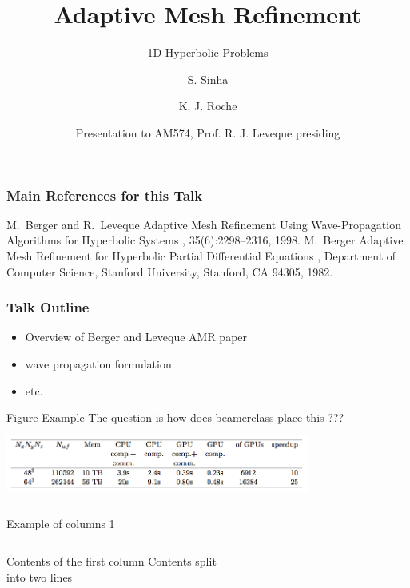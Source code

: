 \documentclass{beamer}
\title[Crisis] %
{Adaptive Mesh Refinement}
\subtitle{1D Hyperbolic Problems}
\author[Author, A] %
{S. Sinha\inst{1} \and K. J. Roche\inst{1,2}}
\institute[Universities Here and There] %
{
  \inst{1}%
  Department of Applied Mathematics\\
  University of Washington
  \and
  \inst{2}%
  High Performance Computing\\
  Pacific Northwest National Laboratory
}
\date[KPT 2004] %
{Presentation to AM574, Prof. R. J. Leveque presiding}
\begin{document}
\frame{\titlepage}
  
  \begin{frame}[allowframebreaks]
  \frametitle<presentation>{Main References for this Talk}    
  \begin{thebibliography}{10}    
  \beamertemplatearticlebibitems
    M.~Berger and R.~Leveque 
    \newblock Adaptive Mesh Refinement Using Wave-Propagation Algorithms for Hyperbolic Systems
    , 35(6):2298--2316, 1998.
      \beamertemplatearticlebibitems
    M.~Berger
    \newblock Adaptive Mesh Refinement for Hyperbolic Partial Differential Equations
    , Department of Computer Science, Stanford University, Stanford, CA 94305, 1982.
  \end{thebibliography}
\end{frame}

  \begin{frame}
    \frametitle{Talk Outline}
    \begin{itemize}
    \item{Overview of Berger and Leveque AMR paper}
    \item{wave propagation formulation}
    \item{etc.}
    \end{itemize}
  \end{frame}
  
  \begin{frame}{Figure Example}
  The question is how does beamerclass place this ???
          \includegraphics[height=2.5cm,width=10cm]{corrected-titan-4cmp-abm-cpu-gpu.png}
\end{frame}

  \begin{frame}{Example of columns 1}
    \begin{columns}[c] %
     Contents of the first column
     Contents split \\ into two lines
    \end{columns}
\end{frame}
  
\end{document}

